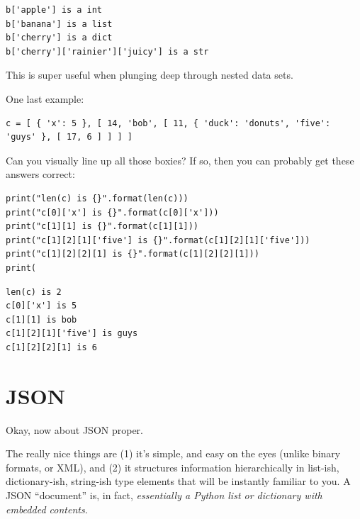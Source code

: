 \begin{Verbatim}[fontsize=\small,samepage=true,frame=leftline,framesep=5mm,framerule=1mm]
b['apple'] is a int
b['banana'] is a list
b['cherry'] is a dict
b['cherry']['rainier']['juicy'] is a str
\end{Verbatim}

This is super useful when plunging deep through nested data sets.

One last example:

\begin{Verbatim}[fontsize=\small,samepage=true,frame=single,framesep=3mm]
c = [ { 'x': 5 }, [ 14, 'bob', [ 11, { 'duck': 'donuts', 'five':
'guys' }, [ 17, 6 ] ] ] ]
\end{Verbatim}


Can you visually line up all those boxies? If so, then you can probably get
these answers correct:

\begin{Verbatim}[fontsize=\small,samepage=true,frame=single,framesep=3mm]
print("len(c) is {}".format(len(c)))
print("c[0]['x'] is {}".format(c[0]['x']))
print("c[1][1] is {}".format(c[1][1]))
print("c[1][2][1]['five'] is {}".format(c[1][2][1]['five']))
print("c[1][2][2][1] is {}".format(c[1][2][2][1]))
print(\end{Verbatim}
\vspace{-.2in}

\begin{Verbatim}[fontsize=\small,samepage=true,frame=leftline,framesep=5mm,framerule=1mm]
len(c) is 2
c[0]['x'] is 5
c[1][1] is bob
c[1][2][1]['five'] is guys
c[1][2][2][1] is 6
\end{Verbatim}



\section{JSON}


Okay, now about JSON proper.

The really nice things are (1) it's simple, and easy on the eyes (unlike
binary formats, or XML), and (2) it structures information hierarchically in
list-ish, dictionary-ish, string-ish type elements that will be instantly
familiar to you. A JSON ``document'' is, in fact, \textit{essentially a Python
list or dictionary with embedded contents.}

